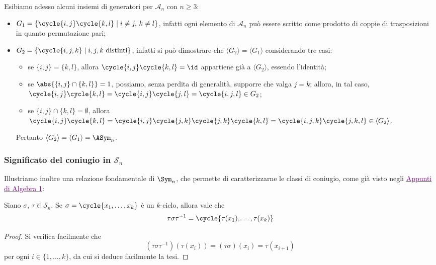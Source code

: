 \documentclass[11pt]{scrartcl}
\begin{document}
	Esibiamo adesso alcuni insiemi di generatori per $\mathcal{A}_n$ con $n \geq 3$:
	\begin{itemize}
		\item $G_1 = \{\cycle{i, j}\cycle{k, l}\mid i\neq j, \, k \neq l\}$, infatti
		ogni elemento di $\mathcal{A}_n$ può essere scritto come prodotto di 
		coppie di trasposizioni in quanto permutazione pari;
		\item $G_2 = \{\cycle{i, j, k}\mid i, j, k\text{ distinti}\}$, infatti si
		può dimostrare che $\langle G_2 \rangle = \langle G_1 \rangle$ considerando
		tre casi:
		\begin{itemize}
			\item se $\{i, j\} = \{k, l\}$, allora $\cycle{i, j}\cycle{k, l} = \id$
			appartiene già a $\langle G_2 \rangle$, essendo l'identità;
			\item se $\abs{\{i, j\}\cap\{k, l\}} = 1$, possiamo, senza perdita di
			generalità, supporre che valga $j = k$; allora, in tal caso,
			$\cycle{i, j}\cycle{k, l} = \cycle{i, j}\cycle{j, l} = \cycle{i, j, l} \in G_2$;
			\item se $\{i, j\}\cap\{k, l\} = \emptyset$, allora
			$\cycle{i, j} \cycle{k, l} = \cycle{i, j} \cycle{j, k} \cycle{j, k} \cycle{k, l} =
			\cycle{i, j, k} \cycle{j, k, l} \in \langle G_2 \rangle$.
		\end{itemize}
		Pertanto $\langle G_2 \rangle = \langle G_1 \rangle = \ASym_n$.
	\end{itemize}
	
	\subsubsection{Significato del coniugio in \texorpdfstring{$\mathcal{S}_n$}{Sₙ}}
	
	Illustriamo inoltre una relazione fondamentale di $\Sym_n$, che permette di
	caratterizzarne le classi di coniugio, come già visto negli \href{https://github.com/diego-unipi/Algebra-1}{\textcolor{purple}{Appunti di Algebra 1}}:
	
	\begin{lemma}
		\label{lemma1.56}
		Siano $\sigma$, $\tau \in \mathcal{S}_n$. Se $\sigma = \cycle{x_1, \ldots, x_k}$ è un 
		$k$-ciclo, allora vale che
		\[
		\tau\sigma\tau^{-1} = \cycle{\tau(x_1),\ldots, \tau(x_k)}
		\]
	\end{lemma}
	
	\begin{proof}
		Si verifica facilmente che
		\[
		(\tau\sigma\tau^{-1})(\tau(x_i)) = (\tau\sigma)(x_i) = \tau(x_{i + 1})
		\]per ogni $i \in \{1, \ldots, k\}$, da cui si deduce facilmente la tesi.
	\end{proof}
	
\end{document}
